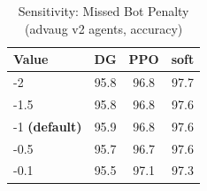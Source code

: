 \begin{table}[h]
\centering
\caption{Sensitivity: Missed Bot Penalty (advaug v2 agents, accuracy)}
\label{tab:sensitivity_penalty_bot_missed_allow}
\begin{tabular}{lccc}
\toprule
Value & DG & PPO & soft \\
\midrule
  -2 & 95.8 & 96.8 & 97.7 \\
  -1.5 & 95.8 & 96.8 & 97.6 \\
  -1 \textbf{(default)} & 95.9 & 96.8 & 97.6 \\
  -0.5 & 95.7 & 96.7 & 97.6 \\
  -0.1 & 95.5 & 97.1 & 97.3 \\
\bottomrule
\end{tabular}
\end{table}